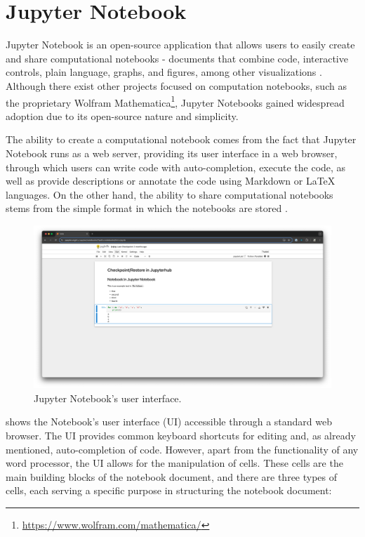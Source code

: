 \documentclass[
  digital,     %
  oneside,     %
  nosansbold,  %
  nocolorbold, %
  lof,         %
  lot,         %
]{fithesis4}
\begin{document}
\section{Jupyter Notebook}
Jupyter Notebook is an open-source application that allows users to easily create and share computational notebooks - documents that combine code, interactive controls, plain language, graphs, and figures, among other visualizations \cite{granger2021jupyter}. Although there exist other projects focused on computation notebooks, such as the proprietary Wolfram Mathematica\footnote{\url{https://www.wolfram.com/mathematica/}}, Jupyter Notebooks gained widespread adoption due to its open-source nature and simplicity.

The ability to create a computational notebook comes from the fact that Jupyter Notebook runs as a web server, providing its user interface in a web browser, through which users can write code with auto-completion, execute the code, as well as provide descriptions or annotate the code using Markdown or LaTeX languages. On the other hand, the ability to share computational notebooks stems from the simple format in which the notebooks are stored \cite{jupyter_notebook}.

\begin{figure}[H]
  \begin{center}
  \includegraphics[width=\textwidth]{figures/jupyter-notebook-screenshot.png}
  \end{center}
  \caption{Jupyter Notebook's user interface.}
  \label{fig:jupyter-notebook-screenshot}
\end{figure}

 shows the Notebook's user interface (UI) accessible through a standard web browser. The UI provides common keyboard shortcuts for editing and, as already mentioned, auto-completion of code. However, apart from the functionality of any word processor, the UI allows for the manipulation of cells. These cells are the main building blocks of the notebook document, and there are three types of cells, each serving a specific purpose in structuring the notebook document:
\end{document}
